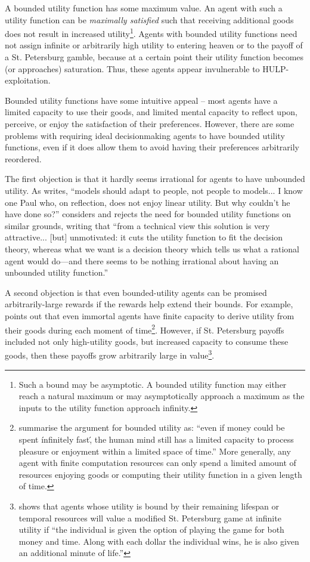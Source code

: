 \documentclass{article}
\begin{document}
A bounded utility function has some maximum value. An agent with such a utility function can be \textit{maximally satisfied} such that receiving additional goods does not result in increased utility\footnote{Such a bound may be asymptotic. A bounded utility function may either reach a natural maximum or may asymptotically approach a maximum as the inputs to the utility function approach infinity.}. Agents with bounded utility functions need not assign infinite or arbitrarily high utility to entering heaven or to the payoff of a St. Petersburg gamble, because at a certain point their utility function becomes (or approaches) saturation. Thus, these agents appear invulnerable to HULP-exploitation. 

Bounded utility functions have some intuitive appeal -- most agents have a limited capacity to use their goods, and limited mental capacity to reflect upon, perceive, or enjoy the satisfaction of their preferences. However, there are some problems with requiring ideal decisionmaking agents to have bounded utility functions, even if it does allow them to avoid having their preferences arbitrarily reordered. 

The first objection is that it hardly seems irrational for agents to have unbounded utility. As \citep{samuelson1977st} writes, ``models should adapt to people, not people to models... I know one Paul who, on reflection, does not enjoy linear utility. But why couldn't he have done so?'' \citep{smith2014evaluative} considers and rejects the need for bounded utility functions on similar grounds, writing that ``from a technical view this solution is very attractive... [but] unmotivated: it cuts the utility function to fit the decision theory, whereas what we want is a decision theory which tells us what a rational agent would do—and there seems to be nothing irrational about having an unbounded utility function.''

A second objection is that even bounded-utility agents can be promised arbitrarily-large rewards if the rewards help extend their bounds. For example, \citep{brito1975becker} points out that even immortal agents have finite capacity to derive utility from their goods during each moment of time\footnote{\citep{cowen1988time} summarise the argument for bounded utility as: ``even if money could be spent \'infinitely fast\', the human mind still has a limited capacity to process pleasure or enjoyment within a limited space of time.'' More generally, any agent with finite computation resources can only spend a limited amount of resources enjoying goods or computing their utility function in a given length of time.}. However, if St. Petersburg payoffs included not only high-utility goods, but increased capacity to consume these goods, then these payoffs grow arbitrarily large in value\footnote{\citep{cowen1988time} shows that agents whose utility is bound by their remaining lifespan or temporal resources will value a modified St. Petersburg game at infinite utility if ``the individual is given the option of playing the game for both money and time. Along with each dollar the individual wins, he is also given an additional minute of life.''}. 
\end{document}
